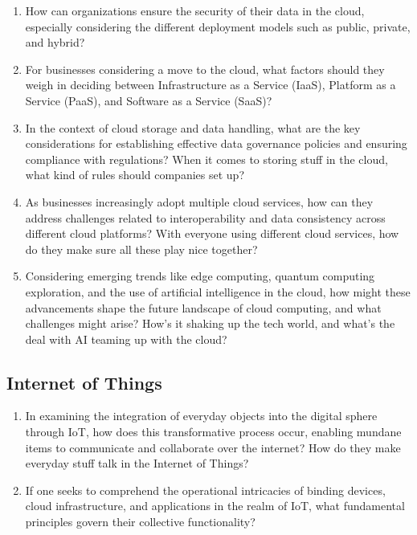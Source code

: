 \documentclass[
  letterpaper,
  DIV=11,
  numbers=noendperiod]{scrreprt}
\begin{document}
\begin{enumerate}
\def\labelenumi{\arabic{enumi}.}
\item
  How can organizations ensure the security of their data in the cloud,
  especially considering the different deployment models such as public,
  private, and hybrid?
\item
  For businesses considering a move to the cloud, what factors should
  they weigh in deciding between Infrastructure as a Service (IaaS),
  Platform as a Service (PaaS), and Software as a Service (SaaS)?
\item
  In the context of cloud storage and data handling, what are the key
  considerations for establishing effective data governance policies and
  ensuring compliance with regulations? When it comes to storing stuff
  in the cloud, what kind of rules should companies set up?
\item
  As businesses increasingly adopt multiple cloud services, how can they
  address challenges related to interoperability and data consistency
  across different cloud platforms? With everyone using different cloud
  services, how do they make sure all these play nice together?
\item
  Considering emerging trends like edge computing, quantum computing
  exploration, and the use of artificial intelligence in the cloud, how
  might these advancements shape the future landscape of cloud
  computing, and what challenges might arise? How's it shaking up the
  tech world, and what's the deal with AI teaming up with the cloud?
\end{enumerate}

\subsection{Internet of Things}\label{internet-of-things}

\begin{enumerate}
\def\labelenumi{\arabic{enumi}.}
\item
  In examining the integration of everyday objects into the digital
  sphere through IoT, how does this transformative process occur,
  enabling mundane items to communicate and collaborate over the
  internet? How do they make everyday stuff talk in the Internet of
  Things?
\item
  If one seeks to comprehend the operational intricacies of binding
  devices, cloud infrastructure, and applications in the realm of IoT,
  what fundamental principles govern their collective functionality?
\end{enumerate}
\end{document}
